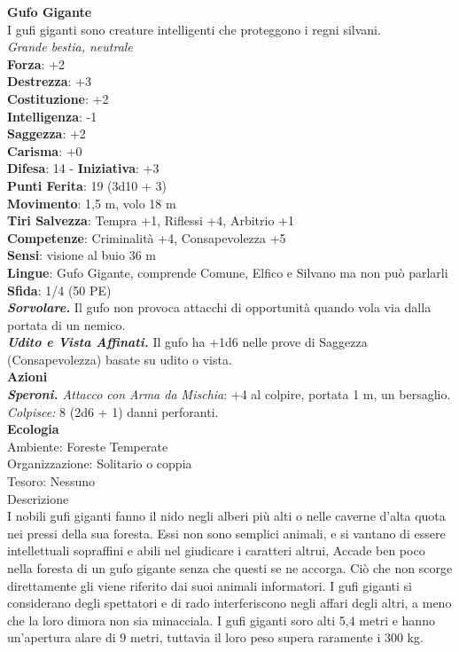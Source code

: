 \begin{multicols}{2}
\medskip\textbf{Gufo Gigante}\\
I gufi giganti sono creature intelligenti che proteggono i regni silvani.\\
\emph{Grande bestia, neutrale}\\
\textbf{Forza}: +2\\
\textbf{Destrezza}: +3\\
\textbf{Costituzione}: +2\\
\textbf{Intelligenza}: -1\\
\textbf{Saggezza}: +2\\
\textbf{Carisma}: +0\\
\textbf{Difesa}: 14 - \textbf{Iniziativa}: +3\\
\textbf{Punti Ferita}: 19 (3d10 + 3)\\
\textbf{Movimento}: 1,5 m, volo 18 m\\
\textbf{Tiri Salvezza}: Tempra +1, Riflessi +4, Arbitrio +1 \\
\textbf{Competenze}: Criminalità +4, Consapevolezza +5\\
\textbf{Sensi}: visione al buio 36 m\\
\textbf{Lingue}: Gufo Gigante, comprende Comune, Elfico e Silvano ma non può parlarli\\
\textbf{Sfida}: 1/4 (50 PE)\smallskip\\
\emph{\textbf{Sorvolare.}} Il gufo non provoca attacchi di opportunità quando vola via dalla portata di un nemico.\\
\emph{\textbf{Udito e Vista Affinati.}} Il gufo ha +1d6 nelle prove di Saggezza (Consapevolezza) basate su udito o vista.\\
\smallskip\textbf{Azioni}\\
\emph{\textbf{Speroni.} Attacco con Arma da Mischia}: +4 al colpire, portata 1 m, un bersaglio.\\
\emph{Colpisce:} 8 (2d6 + 1) danni perforanti.\\
\textbf{Ecologia}\\
Ambiente: Foreste Temperate\\
Organizzazione: Solitario o coppia\\
Tesoro: Nessuno\\
Descrizione\\

I nobili gufi giganti fanno il nido negli alberi più alti o nelle caverne d'alta quota nei pressi della sua foresta. Essi non sono semplici animali, e si vantano di essere intellettuali sopraffini e abili nel giudicare i caratteri altrui, Accade ben poco nella foresta di un gufo gigante senza che questi se ne accorga. Ciò che non scorge direttamente gli viene riferito dai suoi animali informatori. I gufi giganti si considerano degli spettatori e di rado interferiscono negli affari degli altri, a meno che la loro dimora non sia minacciala. I gufi giganti soro alti 5,4 metri e hanno un'apertura alare di 9 metri, tuttavia il loro peso supera raramente i 300 kg. \\



\end{multicols}
